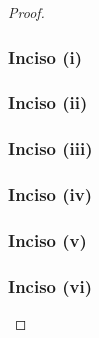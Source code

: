 \begin{proof}
	\subsubsection{Inciso (i)} 
	
	\newpage
	
	\subsubsection{Inciso (ii)} 
	
	\newpage
		
	\subsubsection{Inciso (iii)} \label{problema1_4:inciso3}
	
	\newpage
	
	\subsubsection{Inciso (iv)} 
	
	\newpage
	
	\subsubsection{Inciso (v)}
	
	\newpage
	
	\subsubsection{Inciso (vi)}
	
\end{proof}